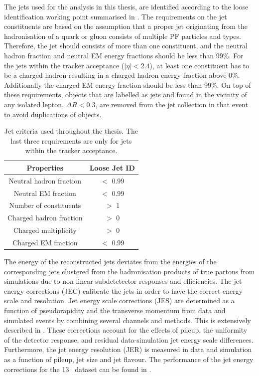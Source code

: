The jets used for the analysis  in this thesis, are identified according to the loose identification working point summarised in . The requirements on the jet constituents are based on the assumption that a proper jet originating from the hadronisation of a quark or gluon consists of multiple PF particles and types. Therefore, the jet should consists of more than one constituent, and the neutral hadron fraction and neutral EM energy fractions should be less than 99\%. For the jets within the tracker acceptance ($|\eta|<2.4$), at least one constituent has to be a charged hadron resulting in a charged hadron energy fraction above 0\%. Additionally the charged EM energy fraction should be less than 99\%. On top of these requirements, objects that are labelled as jets and found in the vicinity of any isolated lepton, $\Delta R < 0.3$, are removed from the jet collection in that event to avoid duplications of objects. 
\begin{table}[h]
	\centering
	\caption{Jet criteria used throughout the thesis. The last three requirements are only for jets within the tracker acceptance.}
	\begin{tabular}{cc}
		\toprule 
		Properties & Loose Jet ID \\ 
		\midrule
		Neutral hadron fraction & $<$ 0.99 \\ 
		
		Neutral EM fraction & $<$ 0.99 \\ 
		
		Number of constituents & $>$ 1 \\ 
		 		
		Charged hadron fraction & $>$ 0 \\ 
	 
		Charged multiplicity & $>$ 0 \\ 
		
		Charged EM fraction & $<$ 0.99 \\ 
		\bottomrule
	\end{tabular} 
	\label{tab:jetID}
\end{table}

The energy of the reconstructed jets deviates from the energies of the corresponding jets clustered from the hadronisation products of true partons from simulations due to non-linear subdetetector responses and efficiencies. The jet energy corrections (JEC) calibrate the jets in order to have the correct energy scale and resolution.
Jet energy scale corrections (JES) are determined as a function of pseudorapidity and the transverse momentum from data and simulated events by combining several channels and methods. This is extensively described in \cite{1748-0221-12-02-P02014}. These corrections account for the effects of pileup, the uniformity of the detector response, and residual data-simulation jet energy scale differences. Furthermore, the jet energy resolution (JER) is measured in data and simulation as a function of pileup, jet size and jet flavour.  %
 The performance of the jet energy corrections for the 13 \TeV\ dataset can be found in \cite{CMS-DP-2016-020}.


